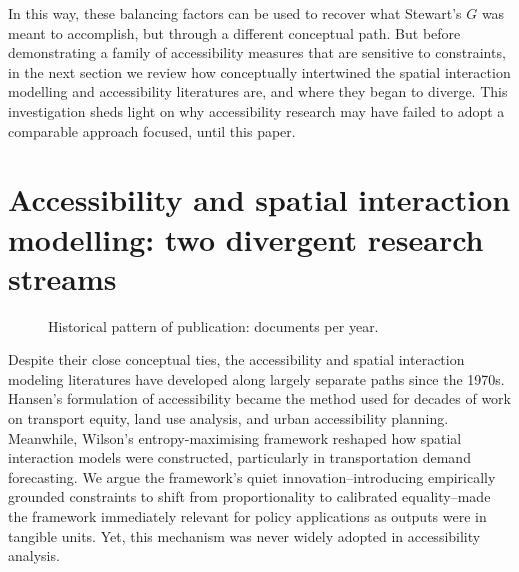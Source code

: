 \documentclass[
  10pt,
  letterpaper,
]{article}
\begin{document}
In this way, these balancing factors can be used to recover what
Stewart's \(G\) was meant to accomplish, but through a different
conceptual path. But before demonstrating a family of accessibility
measures that are sensitive to constraints, in the next section we
review how conceptually intertwined the spatial interaction modelling
and accessibility literatures are, and where they began to diverge. This
investigation sheds light on why accessibility research may have failed
to adopt a comparable approach focused, until this paper.

\section{Accessibility and spatial interaction modelling: two divergent
research
streams}\label{accessibility-and-spatial-interaction-modelling-two-divergent-research-streams}

\begin{figure}[H]


\caption{\label{fig-docs-per-year}Historical pattern of publication:
documents per year.}

\end{figure}%

Despite their close conceptual ties, the accessibility and spatial
interaction modeling literatures have developed along largely separate
paths since the 1970s. Hansen's \citep{hansen1959} formulation of
accessibility became the method used for decades of work on transport
equity, land use analysis, and urban accessibility planning. Meanwhile,
Wilson's \citep{wilson1971} entropy-maximising framework reshaped how
spatial interaction models were constructed, particularly in
transportation demand forecasting. We argue the framework's quiet
innovation--introducing empirically grounded constraints to shift from
proportionality to calibrated equality--made the framework immediately
relevant for policy applications as outputs were in tangible units. Yet,
this mechanism was never widely adopted in accessibility analysis.
\end{document}
